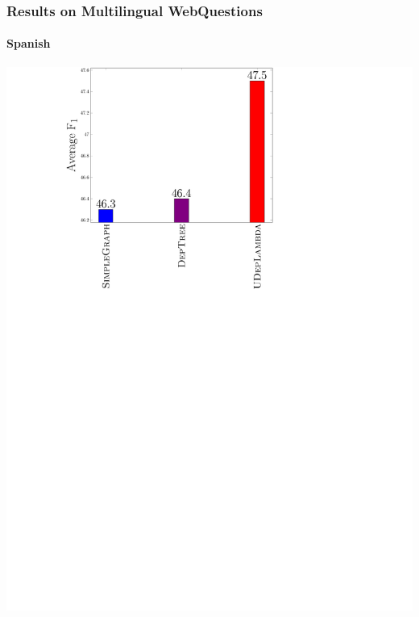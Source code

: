 \documentclass[mathserif,12pt]{beamer}
\begin{document}
\begin{frame}
\frametitle{Results on Multilingual WebQuestions}
\framesubtitle{Spanish}
\centering
\large
\vspace{0.4em}
\includegraphics[trim=9.5em 0em 23em 0.5em,clip=true,scale=0.5]{figures/deplambda_results_plot_ud-es}
\end{frame}
\end{document}
